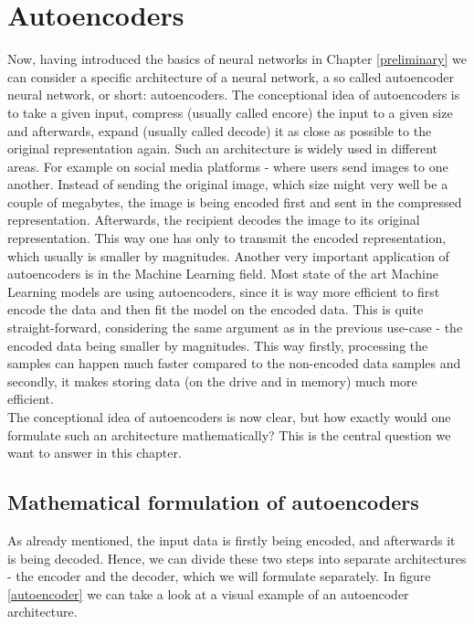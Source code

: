 \chapter{Autoencoders}

Now, having introduced the basics of neural networks in Chapter \ref{preliminary} we can consider a specific architecture of a neural network, a so called autoencoder neural network, or short: autoencoders. The conceptional idea of autoencoders is to take a given input, compress (usually called encore) the input to a given size and afterwards, expand (usually called decode) it as close as possible to the original representation again. Such an architecture is widely used in different areas. For example on social media platforms - where users send images to one another. Instead of sending the original image, which size might very well be a couple of megabytes, the image is being encoded first and sent in the compressed representation. Afterwards, the recipient decodes the image to its original representation. This way one has only to transmit the encoded representation, which usually is smaller by magnitudes.
Another very important application of autoencoders is in the Machine Learning field. Most state of the art Machine Learning models are using autoencoders, since it is way more efficient to first encode the data and then fit the model on the encoded data. This is quite straight-forward, considering the same argument as in the previous use-case - the encoded data being smaller by magnitudes. This way firstly, processing the samples can happen much faster compared to the non-encoded data samples and secondly, it makes storing data (on the drive and in memory) much more efficient.\\
The conceptional idea of autoencoders is now clear, but how exactly would one formulate such an architecture mathematically? This is the central question we want to answer in this chapter.

\section{Mathematical formulation of autoencoders}

As already mentioned, the input data is firstly being encoded, and afterwards it is being decoded. Hence, we can divide these two steps into separate architectures - the encoder and the decoder, which we will formulate separately. In figure \ref{autoencoder} we can take a look at a visual example of an autoencoder architecture.


